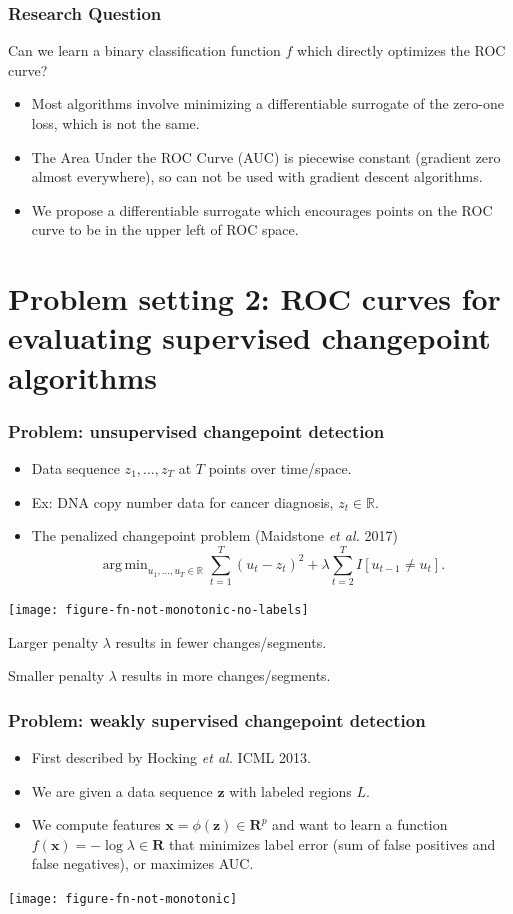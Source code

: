 \documentclass[t]{beamer}
\DeclareMathOperator*{\argmin}{arg\,min}
\begin{document}
\begin{frame}
  \frametitle{Research Question}
  Can we learn a binary classification function $f$ which directly
  optimizes the ROC curve?
  \begin{itemize}
  \item Most algorithms involve minimizing a differentiable surrogate
    of the zero-one loss, which is not the same.
  \item The Area Under the ROC Curve (AUC) is piecewise constant
    (gradient zero almost everywhere), so can not be used with
    gradient descent algorithms.
  \item We propose a differentiable surrogate which encourages points
    on the ROC curve to be in the upper left of ROC space.
  \end{itemize}
\end{frame}
 
\section{Problem setting 2: ROC curves for evaluating supervised changepoint algorithms}

\begin{frame}
  \frametitle{Problem: unsupervised changepoint detection}
  \begin{itemize}
  \item Data sequence $z_1,\dots,z_T$ at $T$ points over time/space.
  \item Ex: DNA copy number data for cancer diagnosis, $z_t\in\mathbb R$.
  \item The penalized changepoint problem (Maidstone \emph{et al.} 2017)
$$\argmin_{u_1,\dots,u_T\in\mathbb R} \sum_{t=1}^T (u_t - z_t)^2 + \lambda\sum_{t=2}^T I[u_{t-1} \neq u_t].$$
  \end{itemize}

  \parbox{0.6\textwidth}{
\texttt{[image: figure-fn-not-monotonic-no-labels]}
}
\parbox{0.3\textwidth}{
  Larger penalty $\lambda$ results in fewer changes/segments.

  \vskip 0.5in

  Smaller penalty $\lambda$ results in more changes/segments.
}

\end{frame}


\begin{frame}
  \frametitle{Problem: weakly supervised changepoint detection}
  \begin{itemize}
  \item First described by Hocking \emph{et al.} ICML 2013.
  \item We are given a data sequence $\mathbf z$ with labeled regions
    $L$.
  \item We compute features $\mathbf x=\phi(\mathbf z)\in\mathbf R^p$
    and want to learn a function $f(\mathbf x)=-\log\lambda\in\mathbf R$ that minimizes label error (sum of false positives and false negatives), or maximizes AUC.
  \end{itemize}

  \texttt{[image: figure-fn-not-monotonic]}

\end{frame}
\end{document}
